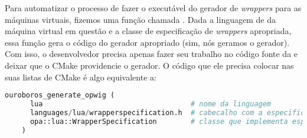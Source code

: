     \vspace{1em}
    
    Para automatizar o processo de fazer o executável do gerador de
    \textit{wrappers} para as máquinas virtuais, fizemos uma função chamada
    . Dada a linguagem de \script{} da
    máquina virtual em questão e a classe de especificação de \textit{wrappers}
    apropriada, essa função gera o código do gerador apropriado (sim, nós geramos o
    gerador). Com isso, o desenvolvedor precisa apenas fazer seu trabalho no
    código fonte da  e deixar que o CMake providencie o
    gerador. O código que ele precisa colocar nas suas listas de CMake é algo
    equivalente a:

    \vspace{1em}
    
  \begin{lstlisting}[language=python]
    ouroboros_generate_opwig (
      lua                                   # nome da linguagem
      languages/lua/wrapperspecification.h  # cabecalho com a especificacao
      opa::lua::WrapperSpecification        # classe que implementa especificao
    )
  \end{lstlisting}

